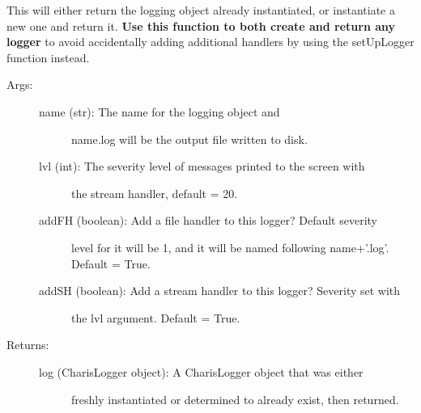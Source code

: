 \documentclass[letterpaper,10pt,english]{sphinxmanual}
\begin{document}
\begin{fulllineitems}
\label{tools:tools.initLogger.getLogger}
This will either return the logging object already
instantiated, or instantiate a new one and return it.  
\textbf{Use this function to both create and return any logger} to avoid 
accidentally adding additional handlers by using the setUpLogger function 
instead.
\begin{description}
\item[{Args:}] \leavevmode\begin{description}
\item[{name (str): The name for the logging object and }] \leavevmode
name.log will be the output file written to disk.

\item[{lvl (int): The severity level of messages printed to the screen with }] \leavevmode
the stream handler, default = 20.

\item[{addFH (boolean): Add a file handler to this logger?  Default severity }] \leavevmode
level for it will be 1, and it will be named following
name+'.log'.  Default = True.

\item[{addSH (boolean): Add a stream handler to this logger? Severity set with }] \leavevmode
the lvl argument.  Default = True.

\end{description}

\item[{Returns:}] \leavevmode\begin{description}
\item[{log (CharisLogger object): A CharisLogger object that was either }] \leavevmode
freshly instantiated or determined to 
already exist, then returned.

\end{description}

\end{description}

\end{fulllineitems}


\begin{fulllineitems}
\label{tools:tools.initLogger.initLogger}
\end{fulllineitems}
\end{document}
